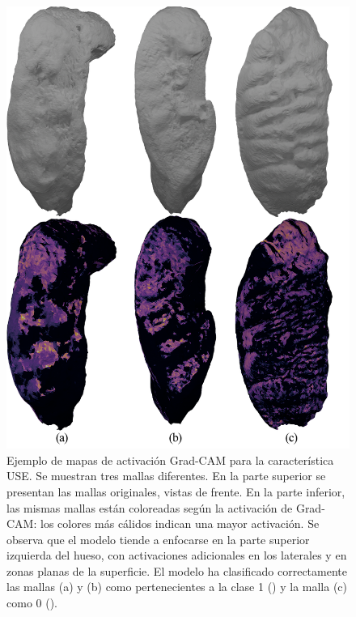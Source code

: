 \begin{figure}[htbp]
    \centering
    \includegraphics[width=\linewidth]{data/grad-cam-USE-samples.png}
    \caption[Ejemplo de mapas de activación Grad-CAM para la característica USE]{Ejemplo de mapas de activación Grad-CAM para la característica USE. Se muestran tres mallas diferentes. En la parte superior se presentan las mallas originales, vistas de frente. En la parte inferior, las mismas mallas están coloreadas según la activación de Grad-CAM: los colores más cálidos indican una mayor activación. Se observa que el modelo tiende a enfocarse en la parte superior izquierda del hueso, con activaciones adicionales en los laterales y en zonas planas de la superficie. El modelo ha clasificado correctamente las mallas (a) y (b) como pertenecientes a la clase 1 () y la malla (c) como 0 ().}
    \label{fig5:grad_cam__USE_samples}
\end{figure}


